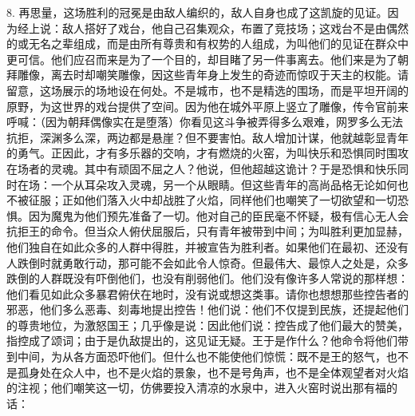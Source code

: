 8. 再思量，这场胜利的冠冕是由敌人编织的，敌人自身也成了这凯旋的见证。因为经上说：敌人搭好了戏台，他自己召集观众，布置了竞技场；这戏台不是由偶然的或无名之辈组成，而是由所有尊贵和有权势的人组成，为叫他们的见证在群众中更可信。他们应召而来是为了一个目的，却目睹了另一件事离去。他们来是为了朝拜雕像，离去时却嘲笑雕像，因这些青年身上发生的奇迹而惊叹于天主的权能。请留意，这场展示的场地设在何处。不是城市，也不是精选的围场，而是平坦开阔的原野，为这世界的戏台提供了空间。因为他在城外平原上竖立了雕像，传令官前来呼喊：（因为朝拜偶像实在是堕落）你看见这斗争被弄得多么艰难，网罗多么无法抗拒，深渊多么深，两边都是悬崖？但不要害怕。敌人增加计谋，他就越彰显青年的勇气。正因此，才有多乐器的交响，才有燃烧的火窑，为叫快乐和恐惧同时围攻在场者的灵魂。其中有顽固不屈之人？他说，但他超越这诡计？于是恐惧和快乐同时在场：一个从耳朵攻入灵魂，另一个从眼睛。但这些青年的高尚品格无论如何也不被征服；正如他们落入火中却战胜了火焰，同样他们也嘲笑了一切欲望和一切恐惧。因为魔鬼为他们预先准备了一切。他对自己的臣民毫不怀疑，极有信心无人会抗拒王的命令。但当众人俯伏屈服后，只有青年被带到中间；为叫胜利更加显赫，他们独自在如此众多的人群中得胜，并被宣告为胜利者。如果他们在最初、还没有人跌倒时就勇敢行动，那可能不会如此令人惊奇。但最伟大、最惊人之处是，众多跌倒的人群既没有吓倒他们，也没有削弱他们。他们没有像许多人常说的那样想：他们看见如此众多暴君俯伏在地时，没有说或想这类事。请你也想想那些控告者的邪恶，他们多么恶毒、刻毒地提出控告！他们说：他们不仅提到民族，还提起他们的尊贵地位，为激怒国王；几乎像是说：因此他们说：控告成了他们最大的赞美，指控成了颂词；由于是仇敌提出的，这见证无疑。王于是作什么？他命令将他们带到中间，为从各方面恐吓他们。但什么也不能使他们惊慌：既不是王的怒气，也不是孤身处在众人中，也不是火焰的景象，也不是号角声，也不是全体观望者对火焰的注视；他们嘲笑这一切，仿佛要投入清凉的水泉中，进入火窑时说出那有福的话：\par

